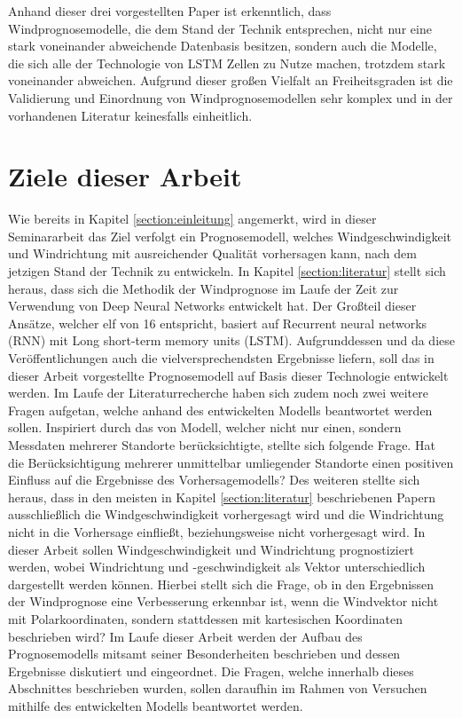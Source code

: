 \documentclass[
12pt, %
toc=listofnumbered, %
toc=chapterentrydotfill, %
numbers=noenddot, %
captions=tableheading, %
bibliography=numbered
]{scrreprt}
\let\Oldsection\section
\renewcommand{\section}{\FloatBarrier\Oldsection}
\begin{document}
Anhand dieser drei vorgestellten Paper ist erkenntlich, dass Windprognosemodelle, die dem Stand der Technik entsprechen, nicht nur eine stark voneinander abweichende Datenbasis besitzen, sondern auch die Modelle, die sich alle der Technologie von LSTM Zellen 
zu Nutze machen, trotzdem stark voneinander abweichen. Aufgrund dieser großen Vielfalt an Freiheitsgraden ist die Validierung und Einordnung von Windprognosemodellen sehr komplex und in der vorhandenen Literatur keinesfalls einheitlich.

\section{Ziele dieser Arbeit}

Wie bereits in Kapitel \ref{section:einleitung} angemerkt, wird in dieser Seminararbeit das Ziel verfolgt ein Prognosemodell, welches Windgeschwindigkeit und Windrichtung mit ausreichender Qualität vorhersagen kann, nach dem jetzigen Stand der Technik zu entwickeln. 
In Kapitel \ref{section:literatur} stellt sich heraus, dass sich die Methodik der Windprognose im Laufe der Zeit zur Verwendung von Deep Neural Networks entwickelt hat. Der Großteil dieser Ansätze, welcher elf von 16 entspricht, basiert auf Recurrent neural networks (RNN) mit Long short-term memory units (LSTM). 
Aufgrunddessen und da diese Veröffentlichungen auch die vielversprechendsten Ergebnisse liefern, soll das in dieser Arbeit vorgestellte Prognosemodell auf Basis dieser Technologie entwickelt werden. 
Im Laufe der Literaturrecherche haben sich zudem noch zwei weitere Fragen aufgetan, welche anhand des entwickelten Modells beantwortet werden sollen. 
Inspiriert durch das von \citeauthor{2019_Chen_MultifactorSpatiotemporalCorrelation}\cite{2019_Chen_MultifactorSpatiotemporalCorrelation} Modell, welcher nicht nur einen, sondern Messdaten mehrerer Standorte berücksichtigte, stellte sich folgende Frage. 
Hat die Berücksichtigung mehrerer unmittelbar umliegender Standorte einen positiven Einfluss auf die Ergebnisse des Vorhersagemodells? 
Des weiteren stellte sich heraus, dass in den meisten in Kapitel \ref{section:literatur} beschriebenen Papern ausschließlich die Windgeschwindigkeit vorhergesagt wird und die Windrichtung nicht in die Vorhersage einfließt, beziehungsweise nicht vorhergesagt wird. 
In dieser Arbeit sollen Windgeschwindigkeit und Windrichtung prognostiziert werden, wobei Windrichtung und -geschwindigkeit als Vektor unterschiedlich dargestellt werden können. 
Hierbei stellt sich die Frage, ob in den Ergebnissen der Windprognose eine Verbesserung erkennbar ist, wenn die Windvektor nicht mit Polarkoordinaten, sondern stattdessen mit kartesischen Koordinaten beschrieben wird? 
Im Laufe dieser Arbeit werden der Aufbau des Prognosemodells mitsamt seiner Besonderheiten beschrieben und dessen Ergebnisse diskutiert und eingeordnet. 
Die Fragen, welche innerhalb dieses Abschnittes beschrieben wurden, sollen daraufhin im Rahmen von Versuchen mithilfe des entwickelten Modells beantwortet werden.
\end{document}
